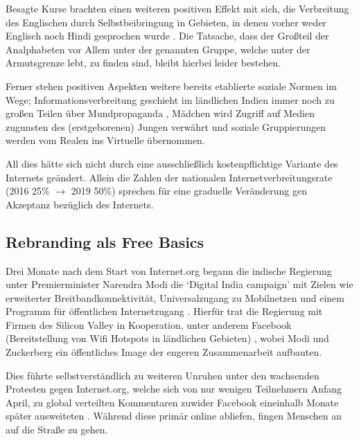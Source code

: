 \documentclass{article}
\begin{document}
\medskip

Besagte Kurse brachten einen weiteren positiven Effekt mit sich, die Verbreitung des Englischen durch Selbstbeibringung in Gebieten, in denen vorher weder Englisch noch Hindi gesprochen wurde \parencite{empowermentThroughFacebook}. Die Tatsache, dass der Großteil der Analphabeten vor Allem unter der genannten Gruppe, welche unter der Armutsgrenze lebt, zu finden sind, bleibt hierbei leider bestehen.

\medskip

Ferner stehen positiven Aspekten weitere bereits etablierte soziale Normen im Wege; Informationsverbreitung geschieht im ländlichen Indien immer noch zu großen Teilen über Mundpropaganda \parencite[259]{everydayLife}, Mädchen wird Zugriff auf Medien zugunsten des (erstgeborenen) Jungen verwährt \parencite{empowermentThroughFacebook} und soziale Gruppierungen werden vom Realen ins Virtuelle übernommen.

\medskip

All dies hätte sich nicht durch eine ausschließlich kostenpflichtige Variante des Internets geändert.
Allein die Zahlen der nationalen Internetverbreitungsrate (2016 25\% $\to$ 2019 50\%) sprechen für eine graduelle Veränderung gen Akzeptanz bezüglich des Internets.

\subsection{Rebranding als Free Basics}

Drei Monate nach dem Start von Internet.org begann die indische Regierung unter Premierminister Narendra Modi die `Digital India campaign' mit Zielen wie erweiterter Breitbandkonnektivität, Universalzugang zu Mobilnetzen und einem Programm für öffentlichen Internetzugang \parencite{digitalPillars}.
Hierfür trat die Regierung mit Firmen des Silicon Valley in Kooperation, unter anderem Facebook (Bereitstellung von Wifi Hotspots in ländlichen Gebieten) \parencite[254]{everydayLife},
wobei Modi und Zuckerberg ein öffentliches Image der engeren Zusammenarbeit aufbauten.

\medskip

Dies führte selbstverständlich zu weiteren Unruhen unter den wachsenden Protesten gegen Internet.org, welche sich von nur wenigen Teilnehmern Anfang April, zu global verteilten Kommentaren zuwider Facebook eineinhalb Monate später ausweiteten \autocite{BBC3}.
Während diese primär online abliefen, fingen Menschen an auf die Straße zu gehen.
\end{document}
